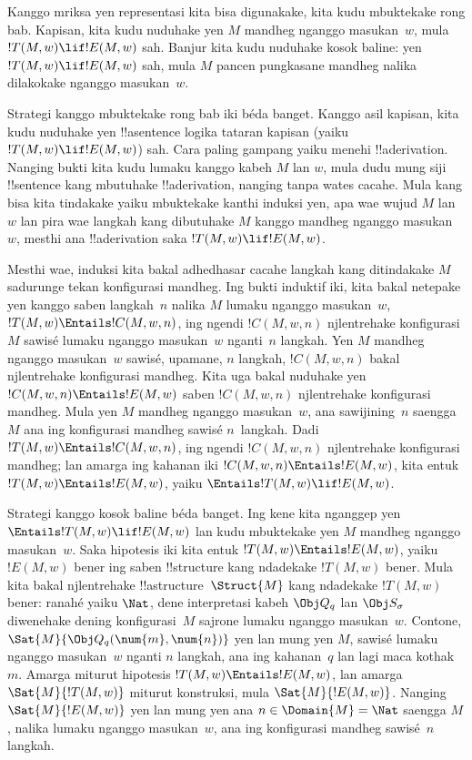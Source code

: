 \documentclass[../../../include/open-logic-section]{subfiles}
\begin{document}

\begin{explain}
Kanggo mriksa yen representasi kita bisa digunakake,
kita kudu mbuktekake rong bab. Kapisan, kita kudu
nuduhake yen $M$ mandheg nganggo masukan~$w$, mula
$!T(M, w) \lif !E(M, w)$ sah. Banjur kita kudu
nuduhake kosok baline: yen $!T(M, w) \lif !E(M, w)$
sah, mula $M$ pancen pungkasane mandheg nalika
dilakokake nganggo masukan~$w$.

Strategi kanggo mbuktekake rong bab iki béda banget.
Kanggo asil kapisan, kita kudu nuduhake yen
!!a{sentence} logika tataran kapisan (yaiku
$!T(M, w) \lif !E(M, w)$) sah. Cara paling
gampang yaiku menehi !!a{derivation}. Nanging
bukti kita kudu lumaku kanggo kabeh $M$ lan $w$,
mula dudu mung siji !!{sentence} kang mbutuhake
!!a{derivation}, nanging tanpa wates cacahe.
Mula kang bisa kita tindakake yaiku mbuktekake
kanthi induksi yen, apa wae wujud $M$ lan~$w$
lan pira wae langkah kang dibutuhake $M$
kanggo mandheg nganggo masukan~$w$, mesthi ana
!!a{derivation} saka $!T(M, w) \lif !E(M, w)$.

Mesthi wae, induksi kita bakal adhedhasar cacahe
langkah kang ditindakake $M$ sadurunge tekan
konfigurasi mandheg. Ing bukti induktif iki,
kita bakal netepake yen kanggo saben langkah~$n$
nalika $M$ lumaku nganggo masukan~$w$,
$!T(M, w) \Entails !C(M, w, n)$, ing ngendi
$!C(M, w, n)$ njlentrehake konfigurasi $M$
sawisé lumaku nganggo masukan~$w$ nganti~$n$
langkah. Yen $M$ mandheg nganggo masukan~$w$
sawisé, upamane, $n$ langkah, $!C(M, w, n)$
bakal njlentrehake konfigurasi mandheg.
Kita uga bakal nuduhake yen $!C(M, w, n)
\Entails !E(M, w)$ saben $!C(M, w, n)$
njlentrehake konfigurasi mandheg. Mula yen
$M$ mandheg nganggo masukan~$w$, ana sawijining~$n$
saengga $M$ ana ing konfigurasi mandheg sawisé
$n$~langkah. Dadi $!T(M, w) \Entails !C(M, w, n)$,
ing ngendi $!C(M, w, n)$ njlentrehake konfigurasi
mandheg; lan amarga ing kahanan iki
$!C(M, w, n) \Entails !E(M, w)$, kita entuk
$!T(M, w) \Entails !E(M, w)$, yaiku
$\Entails !T(M, w) \lif !E(M, w)$.

Strategi kanggo kosok baline béda banget.
Ing kene kita nganggep yen
$\Entails !T(M, w) \lif !E(M, w)$
lan kudu mbuktekake yen $M$ mandheg
nganggo masukan~$w$. Saka hipotesis iki
kita entuk $!T(M, w) \Entails !E(M, w)$,
yaiku $!E(M, w)$ bener ing saben
!!{structure} kang ndadekake $!T(M, w)$
bener. Mula kita bakal njlentrehake
!!a{structure}~$\Struct{M}$ kang ndadekake
$!T(M, w)$ bener: ranahé yaiku $\Nat$,
dene interpretasi kabeh $\Obj Q_q$ lan
$\Obj S_\sigma$ diwenehake dening
konfigurasi~$M$ sajrone lumaku nganggo
masukan~$w$. Contone,
$\Sat{M}{\Obj Q_q(\num{m}, \num{n})}$
yen lan mung yen $M$, sawisé lumaku
nganggo masukan~$w$ nganti $n$ langkah,
ana ing kahanan~$q$ lan lagi maca
kothak~$m$.
 Amarga miturut hipotesis
$!T(M, w) \Entails !E(M, w)$,
lan amarga $\Sat{M}{!T(M, w)}$
miturut konstruksi, mula $\Sat{M}{!E(M, w)}$.
Nanging $\Sat{M}{!E(M, w)}$
yen lan mung yen ana $n \in \Domain{M} = \Nat$
saengga $M$, nalika lumaku nganggo
masukan~$w$, ana ing konfigurasi mandheg
sawisé~$n$ langkah.
\end{explain}
\end{document}
